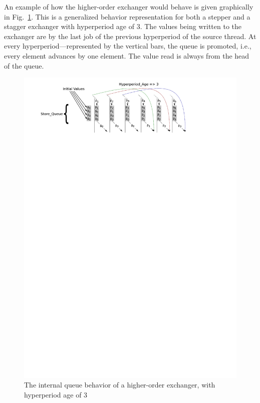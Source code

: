 An example of how the higher-order exchanger would behave is given
graphically in Fig.~\ref{fig:ho-exch}. This is a generalized behavior
representation for both a stepper and a stagger exchanger with
hyperperiod age of 3. The values being written to the exchanger are by
the last job of the previous hyperperiod of the source thread. At
every hyperperiod---represented by the vertical bars, the queue is
promoted, i.e., every element advances by one element. The value read
is always from the head of the queue.

\begin{figure}
\centering
\includegraphics{figs/ho-exch}
\caption{The internal queue behavior of a higher-order exchanger, with
  hyperperiod age of 3}
\label{fig:ho-exch}
\end{figure}

